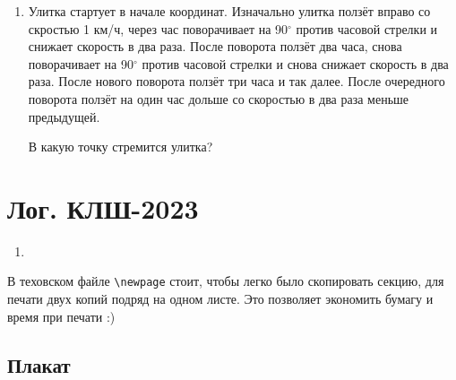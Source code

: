 \documentclass[12pt]{article}
\theoremstyle{definition}
\begin{document}
{\begin{enumerate}
  \begin{minipage}{\linewidth}
    \begin{multicols}{3}
      \begin{enumerate}    
      \item $z^2 = -1$; 
      \item $z^2 = i$; 
      \item $z^2 = 1 + i$; 
      \item $z^3 = 1$;
      \item $z^6 = -1$;
      \item $z^4 = -i$;
    \end{enumerate}
  \end{multicols}
  \end{minipage}
  \item Улитка стартует в начале координат. 
  Изначально улитка ползёт вправо со скростью 1 км/ч, через час поворачивает на 90$^{\circ}$ против часовой стрелки 
  и снижает скорость в два раза. После поворота ползёт два часа, снова поворачивает на  90$^{\circ}$ против часовой стрелки и
  снова снижает скорость в два раза. После нового поворота ползёт три часа и так далее. 
  После очередного поворота ползёт на один час дольше со скоростью в два раза меньше предыдущей. 

  В какую точку стремится улитка?
  

\end{enumerate}
}


\newpage
\dayone
\vfill
\dayone

\newpage
\daytwo
\vfill
\daytwo
\newpage




\newpage

\section{Лог. КЛШ-2023}

\begin{enumerate}
  \item 
\end{enumerate}

В теховском файле \verb|\newpage| стоит, чтобы легко было скопировать секцию, для печати двух копий подряд на одном листе.
Это позволяет экономить бумагу и время при печати :)

\subsection{Плакат}
\end{document}
